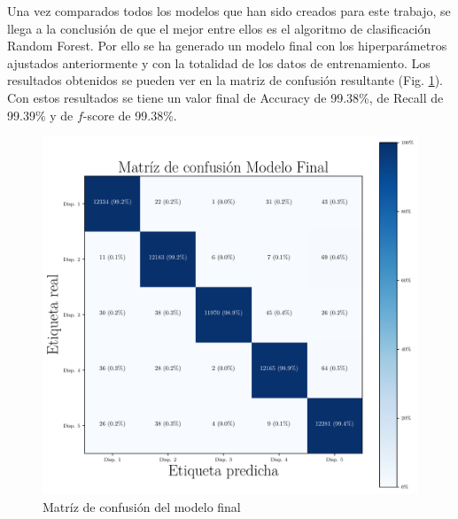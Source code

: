 Una vez comparados todos los modelos que han sido creados para este trabajo, se llega a la conclusión de que el mejor entre ellos es el algoritmo de clasificación Random Forest. Por ello se ha generado un modelo final con los hiperparámetros ajustados anteriormente y con la totalidad de los datos de entrenamiento. Los resultados obtenidos se pueden ver en la matriz de confusión resultante (Fig. \ref{fig:final_matrix}). Con estos resultados se tiene un valor final de Accuracy de 99.38\%, de Recall de 99.39\% y de $f$-score de 99.38\%.



\begin{figure}[H]
    \centering
    \includegraphics[scale=0.3]{../Python/plots/parallel/final_model_matrix}
    \caption{Matríz de confusión del modelo final}
    \label{fig:final_matrix}
\end{figure}
